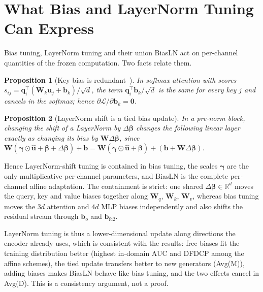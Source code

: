 \documentclass[fonts]{icst}
\newtheorem{proposition}{Proposition}
\begin{document}
\section{What Bias and LayerNorm Tuning Can Express}
\label{sec:analysis}

Bias tuning, LayerNorm tuning and their union BiasLN act on per-channel quantities of the frozen computation. Two facts relate them.

\begin{proposition}[Key bias is redundant~\cite{namazifar2023bias}]
\label{prop:key}
In softmax attention with scores $s_{ij}=\mathbf{q}_i^\top(\mathbf{W}_k\mathbf{u}_j+\mathbf{b}_k)/\sqrt{d}$, the term $\mathbf{q}_i^\top\mathbf{b}_k/\sqrt{d}$ is the same for every key $j$ and cancels in the softmax; hence $\partial\mathcal{L}/\partial\mathbf{b}_k=\mathbf{0}$.
\end{proposition}

\begin{proposition}[LayerNorm shift is a tied bias update]
\label{prop:fold}
In a pre-norm block, changing the shift of a LayerNorm by $\Delta\boldsymbol{\beta}$ changes the following linear layer exactly as changing its bias by $\mathbf{W}\Delta\boldsymbol{\beta}$, since $\mathbf{W}(\boldsymbol{\gamma}\odot\hat{\mathbf{u}}+\boldsymbol{\beta}+\Delta\boldsymbol{\beta})+\mathbf{b}=\mathbf{W}(\boldsymbol{\gamma}\odot\hat{\mathbf{u}}+\boldsymbol{\beta})+(\mathbf{b}+\mathbf{W}\Delta\boldsymbol{\beta})$.
\end{proposition}

Hence LayerNorm-shift tuning is contained in bias tuning, the scales $\boldsymbol{\gamma}$ are the only multiplicative per-channel parameters, and BiasLN is the complete per-channel affine adaptation. The containment is strict: one shared $\Delta\boldsymbol{\beta}\in\mathbb{R}^{d}$ moves the query, key and value biases together along $\mathbf{W}_q$, $\mathbf{W}_k$, $\mathbf{W}_v$, whereas bias tuning moves the $3d$ attention and $4d$ MLP biases independently and also shifts the residual stream through $\mathbf{b}_o$ and $\mathbf{b}_{\mathrm{fc2}}$.

LayerNorm tuning is thus a lower-dimensional update along directions the encoder already uses, which is consistent with the results: free biases fit the training distribution better (highest in-domain AUC and DFDCP among the affine schemes), the tied update transfers better to new generators (Avg(M)), adding biases makes BiasLN behave like bias tuning, and the two effects cancel in Avg(D). This is a consistency argument, not a proof.
\end{document}
